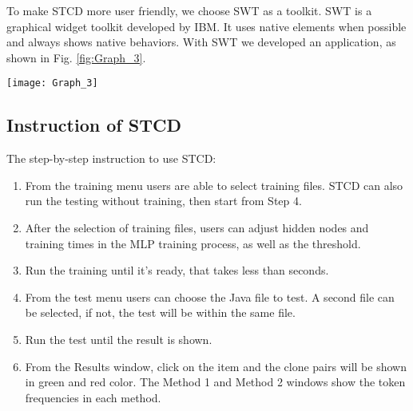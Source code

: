 \documentclass[../main.tex]{subfiles}
\begin{document}
To make STCD more user friendly, we choose SWT as a toolkit. SWT is a graphical widget toolkit developed by IBM. It uses native elements when possible and always shows native behaviors. With SWT we developed an application, as shown in Fig. \ref{fig:Graph_3}.

\begin{figure*}
\centering \texttt{[image: Graph\_3]} 
\caption{User Interface} \label{fig:Graph_3}
\end{figure*}

\subsection{Instruction of STCD}

The step-by-step instruction to use STCD:

\begin{enumerate}
\item From the training menu users are able to select training files. STCD can also run the testing without training, then start from Step 4.
\item After the selection of training files, users can adjust hidden nodes and training times in the MLP training process, as well as the threshold. 
\item Run the training until it's ready, that takes less than seconds. 
\item From the test menu users can choose the Java file to test. A second file can be selected, if not, the test will be within the same file. 
\item Run the test until the result is shown.
\item From the Results window, click on the item and the clone pairs will be shown in green and red color. The Method 1 and Method 2 windows show the token frequencies in each method.
\end{enumerate}
\end{document}
